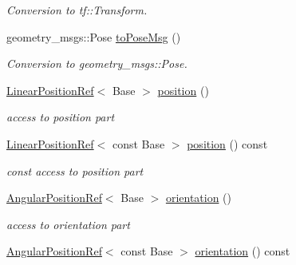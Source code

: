 \begin{DoxyCompactItemize}
\begin{DoxyCompactList}\small\item\em Conversion to tf\+::\+Transform. \end{DoxyCompactList}\item 
geometry\+\_\+msgs\+::\+Pose \hyperlink{classow__core_1_1CartesianPosition_ace8d8abe4ab2df0f7d9c845b394bcbee}{to\+Pose\+Msg} ()\hypertarget{classow__core_1_1CartesianPosition_ace8d8abe4ab2df0f7d9c845b394bcbee}{}\label{classow__core_1_1CartesianPosition_ace8d8abe4ab2df0f7d9c845b394bcbee}

\begin{DoxyCompactList}\small\item\em Conversion to geometry\+\_\+msgs\+::\+Pose. \end{DoxyCompactList}\item 
\hyperlink{classow__core_1_1LinearPositionRef}{Linear\+Position\+Ref}$<$ Base $>$ \hyperlink{classow__core_1_1CartesianPosition_a88a102e34201fe73051c56a1dc71b9c1}{position} ()\hypertarget{classow__core_1_1CartesianPosition_a88a102e34201fe73051c56a1dc71b9c1}{}\label{classow__core_1_1CartesianPosition_a88a102e34201fe73051c56a1dc71b9c1}

\begin{DoxyCompactList}\small\item\em access to position part \end{DoxyCompactList}\item 
\hyperlink{classow__core_1_1LinearPositionRef}{Linear\+Position\+Ref}$<$ const Base $>$ \hyperlink{classow__core_1_1CartesianPosition_adcb4a6deef06f26423e7a6ce5943d83e}{position} () const \hypertarget{classow__core_1_1CartesianPosition_adcb4a6deef06f26423e7a6ce5943d83e}{}\label{classow__core_1_1CartesianPosition_adcb4a6deef06f26423e7a6ce5943d83e}

\begin{DoxyCompactList}\small\item\em const access to position part \end{DoxyCompactList}\item 
\hyperlink{classow__core_1_1AngularPositionRef}{Angular\+Position\+Ref}$<$ Base $>$ \hyperlink{classow__core_1_1CartesianPosition_a1e7078e6698fcefe907e45d82df18fab}{orientation} ()\hypertarget{classow__core_1_1CartesianPosition_a1e7078e6698fcefe907e45d82df18fab}{}\label{classow__core_1_1CartesianPosition_a1e7078e6698fcefe907e45d82df18fab}

\begin{DoxyCompactList}\small\item\em access to orientation part \end{DoxyCompactList}\item 
\hyperlink{classow__core_1_1AngularPositionRef}{Angular\+Position\+Ref}$<$ const Base $>$ \hyperlink{classow__core_1_1CartesianPosition_aebff574a5f054528f777f1151e9f0798}{orientation} () const \hypertarget{classow__core_1_1CartesianPosition_aebff574a5f054528f777f1151e9f0798}{}\label{classow__core_1_1CartesianPosition_aebff574a5f054528f777f1151e9f0798}


\end{DoxyCompactItemize}

